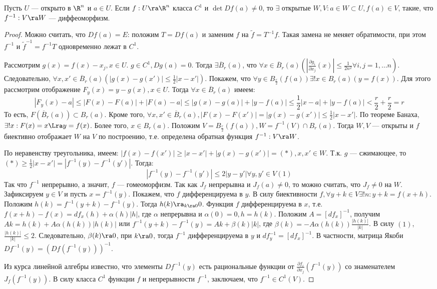 \begin{theorem}
    Пусть \(U\) --- открыто в \(\R^n\) и \(a \in U\). Если \(f: U \ra \R^n\) класса \(C^1\) и \(\det Df(a) \ne 0\), то \(\exists\) открытые \(W, V: a \in W \subset U, f(a) \in V\), такие, что \(f^{-1}: V \ra W\) --- диффеоморфизм.
\end{theorem}
\begin{proof}
    Можно считать, что \(Df(a) = E\): положим \(T = Df(a)\) и заменим \(f\) на \(\tilde{f} = T^{-1}f\). Такая замена не меняет обратимости, при этом \(f^{-1}\) и \(\tilde{f}^{-1} = f^{-1}T\) одновременно лежат в \(C^1\).

    Рассмотрим \(g(x) = f(x) - x_j, x \in U\). \(g \in C^1, Dg(a) = 0\). Тогда \(\exists \overline{B}_r(a)\), что \(\forall x \in \overline{B}_r(a) \left(\left| \frac{\partial g_i}{\partial x_j}(x) \right| \le \frac{1}{2n^2} \forall i, j = 1, \dots n\right)\). Следовательно, \(\forall x, x' \in \overline{B}_r(a) (|g(x) - g(x')| \le \frac{1}{2}|x - x'|)\). Покажем, что \(\forall y \in B_{\frac{r}{2}}(f(a)) \exists !x \in B_r(a) (y = f(x))\). Для этого рассмотрим отображение \(F_y(x) = y - g(x), x \in U\). Тогда \(\forall x \in \overline{B}_r(a)\) имеем: 
    \[|F_y(x) - a| \le |F(x) - F(a)| + |F(a) - a| \le |g(x) - g(a)| + |y - f(a)| \le \frac{1}{2}|x - a| + |y - f(a)| < \frac{r}{2} + \frac{r}{2} = r\]
    То есть, \(F(\overline{B}_r(a)) \subset B_r(a)\). Кроме того, \(\forall x, x' \in \overline{B}_r(a), |F(x) - F(x')| = |g(x) - g(x')| \le \frac{1}{2}|x - x'|\). По теореме Банаха, \(\exists! x: F(x) = x \Lra y = f(x)\). Более того, \(x \in B_r(a)\). Положим \(V = B_{\frac{r}{2}}(f(a)), W = f^{-1}(V) \cap B_r(a)\). Тогда \(W, V\) --- открыты и \(f\) биективно отображает \(W\) на \(V\) по построению, т.е. определена обратная функция \(f^{-1}: V \ra W\).

    По неравенству треугольника, имеем: \(|f(x) - f(x')| \ge |x - x'| + |g(x) - g(x')| = (*), x, x' \in W\). Т.к. \(g\) --- сжимающее, то \((*) \ge \frac{1}{2}|x - x'| = |f^{-1}(y) - f^{-1}(y')|\). Тогда:
    \[|f^{-1}(y) - f^{-1}(y')| \le 2|y - y'| \forall y, y' \in V (1)\]
    Так что \(f^{-1}\) непрерывно, а значит, \(f\) --- гомеоморфизм.
    Так как \(J_f\) непрерывна и \(J_f(a) \ne 0\), то можно считать, что \(J_f \ne 0\) на \(W\). Зафиксируем \(y \in V\) и пусть \(x = f^{-1}(y)\). Покажем, что \(f\) дифференцируема в \(y\). В силу биективности \(f, \forall y + k \in V \exists ! n : y + k = f(x + h)\). Положим \(h(k) = f^{-1}(y + k) - f^{-1}(y)\). Тогда \(h(k) \ra_{k \ra 0} 0\). Функция \(f\) дифференцируема в \(x\), т.е. \(f(x + h) - f(x) = df_x(h) + \alpha(h)|h|\), где \(\alpha\) непрерывна и \(\alpha(0) = 0, h = h(k)\). Положим \(A = [df_x]^{-1}\), получим \(Ak = h(k) + A\alpha(h(k))|h(k)|\) или \(f^{-1}(y + k) - f^{-1}(y) = Ak + \beta(k)|k|\), где \(\beta(k) = -A\alpha(h(k))\frac{|h(k)|}{|k|}\). В силу \((1)\), \(\frac{|h(k)|}{|k|} \le 2\). Следовательно, \(\beta(k) \ra 0\), при \(k \ra 0\), тогда \(f^{-1}\) дифференцируема в \(y\) и \(df^{-1}_y = [df_x]^{-1}\).
    В частности, матрица Якоби \(Df^{-1}(y) = (Df(f^{-1}(y)))^{-1}\).

    Из курса линейной алгебры известно, что элементы \(Df^{-1}(y)\) есть рациональные функции от \(\frac{\partial f_i}{\partial x_j}(f^{-1}(y))\) со знаменателем \(J_f(f^{-1}(y))\). В силу класса \(C^1\) функции \(f\) и непрерывности \(f^{-1}\), заключаем, что \(f^{-1} \in C^1(V)\).
\end{proof}
